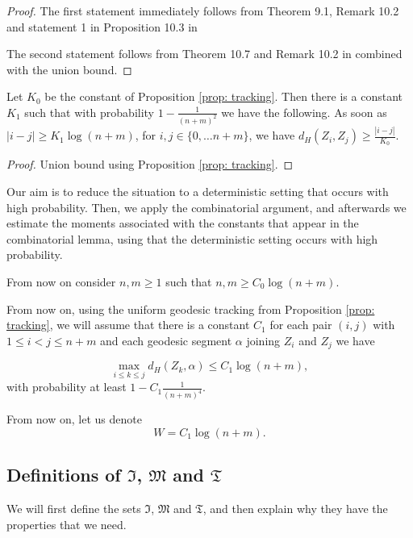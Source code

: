 \begin{proof}
The first statement immediately follows from Theorem 9.1, Remark 10.2 and statement 1 in Proposition 10.3 in \cite{MathieuSisto2020} 

The second statement follows from Theorem 10.7 and Remark 10.2 in \cite{MathieuSisto2020} combined with the union bound.
\end{proof}

\begin{lem}\label{lem: uniform progress}
	Let $K_0$ be the constant of Proposition \ref{prop: tracking}. Then there is a constant $K_1$ such that with probability $1-\frac{1}{(n+m)^2}$ we have the following. As soon as $|i-j|\ge K_1\log(n+m)$, for $i,j\in \{0,\ldots n+m\}$, we have $d_H(Z_i,Z_j)\ge \frac{|i-j|}{K_0}$.
\end{lem}
\begin{proof}
	Union bound using Proposition \ref{prop: tracking}.
\end{proof}

Our aim is to reduce the situation to a deterministic setting that occurs with high probability. Then, we apply the combinatorial argument, and afterwards we estimate the moments associated with the constants that appear in the combinatorial lemma, using that the deterministic setting occurs with high probability.

From now on consider $n,m\ge 1$ such that $n,m \geq C_0\log(n+m)$.

From now on, using the uniform geodesic tracking from Proposition \ref{prop: tracking}, we will assume that  there is a constant $C_1$ for each pair $(i,j)$ with $1 \leq i < j \leq n+m $  and each geodesic segment $\alpha$ joining $Z_i$ and $Z_j$ we have

\[
\max_{ i\leq k \leq j} d_H(Z_k,\alpha) \leq C_1 \log (n+m),
\]
with probability at least $1-C_1\frac{1}{(n+m)^4}$.

From now on, let us denote
$$
W=C_1\log(n+m).
$$



\subsection{Definitions of $\mathfrak{I}$, $\mathfrak{M}$  and $\mathfrak{T}$}
We will first define the sets $\mathfrak{I}$, $\mathfrak{M}$ and $\mathfrak{T}$, and then explain why they have the properties that we need.

